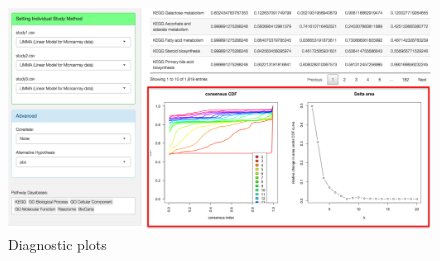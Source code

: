 \begin{figure}[H]
\begin{center}
\includegraphics[scale=0.45]{./figure/metaPath/DiagPlots}
\caption{Diagnostic plots}
\label{fig:DiagPlots}
\end{center}
\end{figure}
